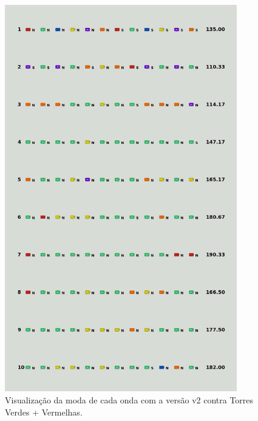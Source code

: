 \begin{figure}[H]
  \centering
  \includegraphics[width=0.9\textwidth]{figuras/td/td_greenred_ai_mode_2_1.png}
  \caption{Visualização da moda de cada onda com a versão v2 contra Torres Verdes + Vermelhas.}
  \label{fig:td-moda-greenred-2-1}
\end{figure}

